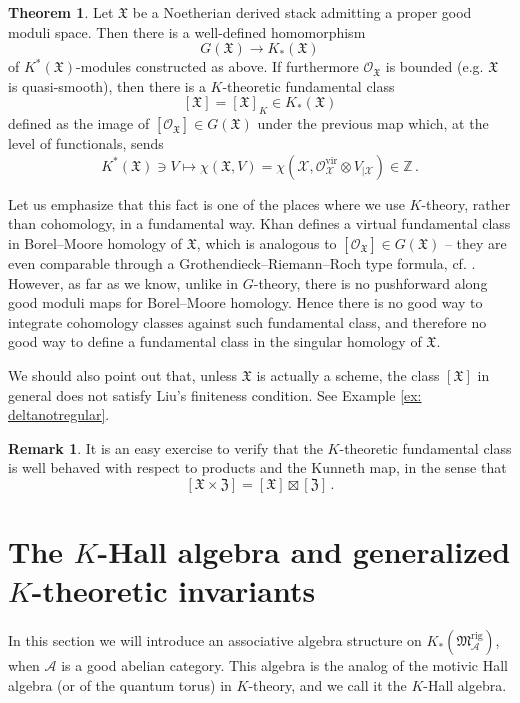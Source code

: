 \documentclass[12pt]{amsart}
\theoremstyle{definition}
\newtheorem{theorem}[definition]{Theorem}
\newtheorem{remark}[definition]{Remark}
\newcommand{\BZ}{{\mathbb{Z}}}
\newcommand{\CA}{{\mathcal A}}
\newcommand{\CO}{{\mathcal O}}
\newcommand{\CX}{{\mathcal X}}
\newcommand{\1}{\mathbf 1}
\newcommand{\FM}{{\mathfrak{M}}}
\newcommand{\FX}{{\mathfrak{X}}}
\newcommand{\FZ}{{\mathfrak{Z}}}
\newcommand{\vir}{\mathrm{vir}}
\newcommand{\rig}{\mathrm{rig}}
\begin{document}
\begin{theorem}\label{thm: deltainvariants}
Let $\FX$ be a Noetherian derived stack admitting a proper good moduli space. Then there is a well-defined homomorphism
\[G(\FX)\to K_\ast(\FX)\]
of $K^\ast(\FX)$-modules constructed as above. If furthermore $\CO_\FX$ is bounded (e.g. $\FX$ is quasi-smooth), then there is a $K$-theoretic fundamental class
\[[\FX]=[\FX]_K\in K_\ast(\FX)\]
defined as the image of $[\CO_\FX]\in G(\FX)$ under the previous map which, at the level of functionals, sends
\[K^\ast(\FX)\ni V\mapsto \chi(\FX, V)=\chi(\CX, \CO_{\CX}^\vir\otimes V_{|\CX})\in \BZ\,.\]
\end{theorem}

Let us emphasize that this fact is one of the places where we use $K$-theory, rather than cohomology, in a fundamental way. Khan \cite{khanVFC} defines a virtual fundamental class in Borel--Moore homology of $\FX$, which is analogous to $[\CO_\FX]\in G(\FX)$ -- they are even comparable through a Grothendieck--Riemann--Roch type formula, cf. \cite[Theorem 3.23]{khanVFC}. However, as far as we know, unlike in $G$-theory, there is no pushforward along good moduli maps for Borel--Moore homology. Hence there is no good way to integrate cohomology classes against such fundamental class, and therefore no good way to define a fundamental class in the singular homology of $\FX$.

We should also point out that, unless $\FX$ is actually a scheme, the class $[\FX]$ in general does not satisfy Liu's finiteness condition. See Example \ref{ex: deltanotregular}.

\begin{remark}\label{rmk: kunnethdelta}
    It is an easy exercise to verify that the $K$-theoretic fundamental class is well behaved with respect to products and the Kunneth map, in the sense that
    \[[\FX\times \FZ]=[\FX]\boxtimes [\FZ]\,.\]
\end{remark}

\section{The $K$-Hall algebra and generalized $K$-theoretic invariants}
\label{sec: Khallinvariants}

In this section we will introduce an associative algebra structure on $K_\ast(\FM_\CA^\rig)$, when $\CA$ is a good abelian category. This algebra is the analog of the motivic Hall algebra (or of the quantum torus) in $K$-theory, and we call it the $K$-Hall algebra. 
\end{document}
